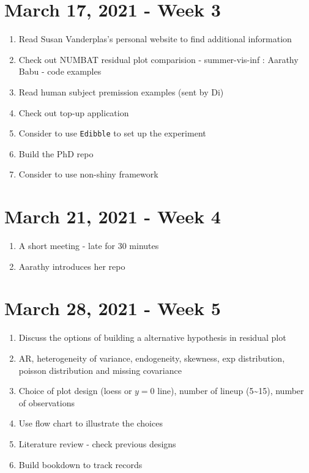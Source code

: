 \documentclass[
]{book}
\providecommand{\tightlist}{%
  \setlength{\itemsep}{0pt}\setlength{\parskip}{0pt}}
\begin{document}
\hypertarget{march-17-2021---week-3}{%
\section{March 17, 2021 - Week 3}\label{march-17-2021---week-3}}

\begin{enumerate}
\def\labelenumi{\arabic{enumi}.}
\tightlist
\item
  Read Susan Vanderplas's personal website to find additional information
\item
  Check out NUMBAT residual plot comparision - summer-vis-inf : Aarathy Babu - code examples
\item
  Read human subject premission examples (sent by Di)
\item
  Check out top-up application
\item
  Consider to use \texttt{Edibble} to set up the experiment
\item
  Build the PhD repo
\item
  Consider to use non-shiny framework
\end{enumerate}

\hypertarget{march-21-2021---week-4}{%
\section{March 21, 2021 - Week 4}\label{march-21-2021---week-4}}

\begin{enumerate}
\def\labelenumi{\arabic{enumi}.}
\tightlist
\item
  A short meeting - late for 30 minutes
\item
  Aarathy introduces her repo
\end{enumerate}

\hypertarget{march-28-2021---week-5}{%
\section{March 28, 2021 - Week 5}\label{march-28-2021---week-5}}

\begin{enumerate}
\def\labelenumi{\arabic{enumi}.}
\tightlist
\item
  Discuss the options of building a alternative hypothesis in residual plot
\item
  AR, heterogeneity of variance, endogeneity, skewness, exp distribution, poisson distribution and missing covariance
\item
  Choice of plot design (loess or \(y=0\) line), number of lineup (5\textasciitilde15), number of observations
\item
  Use flow chart to illustrate the choices
\item
  Literature review - check previous designs
\item
  Build bookdown to track records
\end{enumerate}
\end{document}
